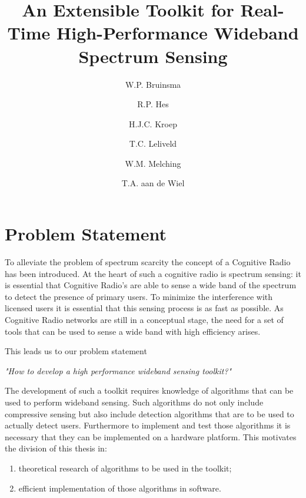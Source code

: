 \documentclass[a4paper, openany, oneside]{memoir}
\title{An Extensible Toolkit for Real-Time High-Performance Wideband Spectrum Sensing}
\author{W.P. Bruinsma \and R.P. Hes \and H.J.C. Kroep \and T.C. Leliveld \and W.M. Melching \and T.A. aan de Wiel}
\begin{document}
\chapter{Problem Statement} \label{cha:problem_statement}
To alleviate the problem of spectrum scarcity the concept of a Cognitive Radio has been introduced.
At the heart of such a cognitive radio is spectrum sensing: it is essential that Cognitive Radio's are able to sense a wide band of the spectrum to detect the presence of primary users. To minimize the interference with licensed users it is essential that this sensing process is as fast as possible. As Cognitive Radio networks are still in a conceptual stage, the need for a set of tools that can be used to sense a wide band with high efficiency arises.

This leads us to our problem statement 

\emph{"How to develop a high performance wideband sensing toolkit?"}

The development of such a toolkit requires knowledge of algorithms that can be used to perform wideband sensing. Such algorithms do not only include compressive sensing but also include detection algorithms that are to be used to actually detect users. Furthermore to implement and test those algorithms it is necessary that they can be implemented on a hardware platform. This motivates the division of this thesis in:

\begin{enumerate}
	\item theoretical research of algorithms to be used in the toolkit;
	\item efficient implementation of those algorithms in software.
\end{enumerate}
\end{document}

